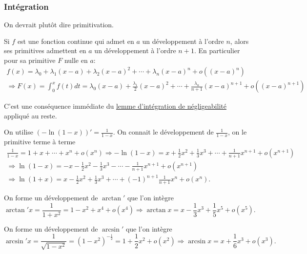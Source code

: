 \subsubsection{Intégration}
On devrait plutôt dire primitivation.
\begin{prop}
 Si $f$ est une fonction continue qui admet en $a$ un développement à l'ordre $n$, alors ses primitives admettent en $a$ un développement à l'ordre $n+1$. En particulier pour sa primitive $F$ nulle en $a$:
\begin{multline*}
 f(x)= \lambda_0 + \lambda_1(x-a)+ \lambda_2(x-a)^2+\cdots+ \lambda_n(x-a)^n+o((x-a)^n)\\
\Rightarrow F(x)=\int_0^xf(t)dt = \lambda_0(x-a) + \frac{\lambda_1}{2}(x-a)^2+\cdots+ \frac{\lambda_n}{n+1}(x-a)^{n+1}+o((x-a)^{n+1})
\end{multline*}
\end{prop}
\begin{demo}
 C'est une conséquence immédiate du \href{\baseurl C2190.pdf}{lemme d'intégration de négligeabilité} appliqué au reste.
\end{demo}
\begin{exple} On utilise $\left( -\ln(1-x)\right)' = \frac{1}{1-x}$. On connait le développement de $\frac{1}{1-x}$, on le primitive terme à terme
\begin{multline*}
 \frac{1}{1-x} = 1 + x + \cdots + x^n + o(x^n)
 \Rightarrow
 -\ln(1-x) = x + \frac{1}{2}x^2 + \frac{1}{3}x^3 + \cdots + \frac{1}{n+1}x^{n+1} + o(x^{n+1}) \\
 \Rightarrow \ln(1-x) = - x - \frac{1}{2}x^2 - \frac{1}{3}x^3 - \cdots - \frac{1}{n+1}x^{n+1} + o(x^{n+1}) \\
 \Rightarrow \ln(1+x) = x - \frac{1}{2}x^2 + \frac{1}{3}x^3 + \cdots + (-1)^{n+1}\frac{1}{n+1}x^{n} + o(x^{n}).
\end{multline*}
\end{exple}

\begin{exple}
  On forme un développement de $\arctan '$ que l'on intègre
\[
  \arctan' x = \frac{1}{1+x^2} = 1 - x^2 + x^4 +o(x^4)
  \Rightarrow
  \arctan x = x - \frac{1}{3}x^3 + \frac{1}{5}x^5 + o(x^5).
\]
\end{exple}

\begin{exple}
  On forme un développement de $\arcsin '$ que l'on intègre
\[
  \arcsin' x = \frac{1}{\sqrt{1-x^2}} = (1-x^2)^{-\frac{1}{2}} = 1 + \frac{1}{2} x^2  + o(x^2)
  \Rightarrow
  \arcsin x = x + \frac{1}{6}x^3 + o(x^3).
\]
\end{exple}


